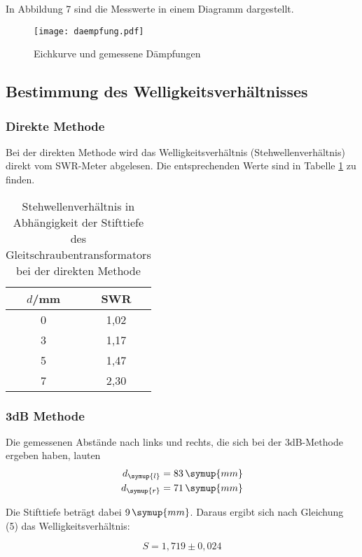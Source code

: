 In Abbildung 7 sind die Messwerte in einem Diagramm dargestellt.

\begin{figure}
  \centering
  \texttt{[image: daempfung.pdf]}
  \caption{Eichkurve und gemessene Dämpfungen}
  \label{fig:plot}
\end{figure}

\subsection{Bestimmung des Welligkeitsverhältnisses}
\subsubsection{Direkte Methode}
Bei der direkten Methode wird das Welligkeitsverhältnis (Stehwellenverhältnis) direkt
vom SWR-Meter abgelesen. Die entsprechenden Werte sind in Tabelle \ref{tab:direkt} zu finden.

\begin{table}[H]
  \centering
  \caption{Stehwellenverhältnis in Abhängigkeit der Stifttiefe des Gleitschraubentransformators bei der direkten Methode}
  \label{tab:direkt}
  \begin{tabular}{c c}
    \toprule
    $d$/mm & SWR \\
    \midrule
    0 &  1,02    \\
    3 &  1,17    \\
    5 &  1,47    \\
    7 &  2,30    \\
    \bottomrule
  \end{tabular}
\end{table}

\subsubsection{3dB Methode}
Die gemessenen Abstände nach links und rechts, die sich bei der 3dB-Methode ergeben haben,
lauten
\begin{align*}
  d_\symup{l} &= 83\, \symup{mm} \\
  d_\symup{r} &= 71\, \symup{mm}
\end{align*}

Die Stifttiefe beträgt dabei $9\, \symup{mm}$.
Daraus ergibt sich nach Gleichung (5) das Welligkeitsverhältnis:

\begin{equation*}
  S = 1,719 \pm 0,024
\end{equation*}

